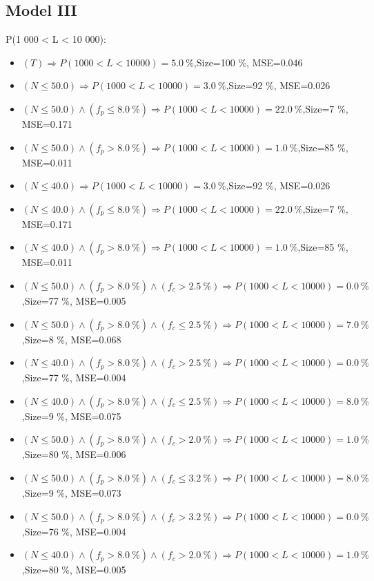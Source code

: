 \documentclass[numbered]{CSL}
\begin{document}
\subsection{Model III}
P(1 000 < L < 10 000):
\begin{itemize}
\item $(T) \Rightarrow P(1 000 < L < 10 000) = 5.0~\%$,\hfill Size=100 \%, MSE=0.046
\item $(N \leq 50.0) \Rightarrow P(1 000 < L < 10 000) = 3.0~\%$,\hfill Size=92 \%, MSE=0.026
\item $(N \leq 50.0) \land (f_p \leq 8.0~\%) \Rightarrow P(1 000 < L < 10 000) = 22.0~\%$,\hfill Size=7 \%, MSE=0.171
\item $(N \leq 50.0) \land (f_p > 8.0~\%) \Rightarrow P(1 000 < L < 10 000) = 1.0~\%$,\hfill Size=85 \%, MSE=0.011
\item $(N \leq 40.0) \Rightarrow P(1 000 < L < 10 000) = 3.0~\%$,\hfill Size=92 \%, MSE=0.026
\item $(N \leq 40.0) \land (f_p \leq 8.0~\%) \Rightarrow P(1 000 < L < 10 000) = 22.0~\%$,\hfill Size=7 \%, MSE=0.171
\item $(N \leq 40.0) \land (f_p > 8.0~\%) \Rightarrow P(1 000 < L < 10 000) = 1.0~\%$,\hfill Size=85 \%, MSE=0.011
\item $(N \leq 50.0) \land (f_p > 8.0~\%) \land (f_c > 2.5~\%) \Rightarrow P(1 000 < L < 10 000) = 0.0~\%$,\hfill Size=77 \%, MSE=0.005
\item $(N \leq 50.0) \land (f_p > 8.0~\%) \land (f_c \leq 2.5~\%) \Rightarrow P(1 000 < L < 10 000) = 7.0~\%$,\hfill Size=8 \%, MSE=0.068
\item $(N \leq 40.0) \land (f_p > 8.0~\%) \land (f_c > 2.5~\%) \Rightarrow P(1 000 < L < 10 000) = 0.0~\%$,\hfill Size=77 \%, MSE=0.004
\item $(N \leq 40.0) \land (f_p > 8.0~\%) \land (f_c \leq 2.5~\%) \Rightarrow P(1 000 < L < 10 000) = 8.0~\%$,\hfill Size=9 \%, MSE=0.075
\item $(N \leq 50.0) \land (f_p > 8.0~\%) \land (f_c > 2.0~\%) \Rightarrow P(1 000 < L < 10 000) = 1.0~\%$,\hfill Size=80 \%, MSE=0.006
\item $(N \leq 50.0) \land (f_p > 8.0~\%) \land (f_c \leq 3.2~\%) \Rightarrow P(1 000 < L < 10 000) = 8.0~\%$,\hfill Size=9 \%, MSE=0.073
\item $(N \leq 50.0) \land (f_p > 8.0~\%) \land (f_c > 3.2~\%) \Rightarrow P(1 000 < L < 10 000) = 0.0~\%$,\hfill Size=76 \%, MSE=0.004
\item $(N \leq 40.0) \land (f_p > 8.0~\%) \land (f_c > 2.0~\%) \Rightarrow P(1 000 < L < 10 000) = 1.0~\%$,\hfill Size=80 \%, MSE=0.005

\end{itemize}
\end{document}
